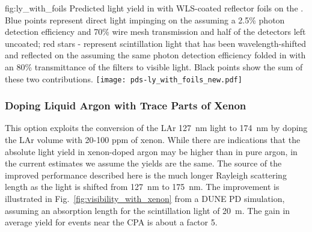 \begin{dunefigure}{fig:ly_with_foils}
{Predicted light yield in with WLS-coated reflector foils on the . Blue points represent direct  light impinging on the  assuming a 2.5\% photon detection efficiency and 70\% wire mesh transmission and half of the detectors left uncoated; red stars - represent scintillation light that has been wavelength-shifted and reflected on the  assuming the same photon detection efficiency folded in with an 80\% transmittance of the filters to visible light. Black points show the sum of these two contributions.}
\texttt{[image: pds-ly\_with\_foils\_new.pdf]}
\end{dunefigure}

\subsubsection{Doping Liquid Argon with Trace Parts of Xenon}
\label{sec:fdsp-pd-enh-xenon}



This option exploits the conversion of the LAr \SI{127}{nm} light to \SI{174}{nm} by doping the LAr volume with 20-100 ppm of xenon.  While there are indications that the absolute light yield in xenon-doped argon may be higher than in pure argon, in the current estimates we assume the yields are the same. The source of the improved performance described here is the much longer Rayleigh scattering length as the light is shifted from \SI{127}{nm} to \SI{175}{nm}.  The improvement is illustrated in Fig.~\ref{fig:visibility_with_xenon} from a DUNE PD simulation, assuming an absorption length for the scintillation light of \SI{20}{m}. The gain in average yield for events near the CPA is about a factor 5.

